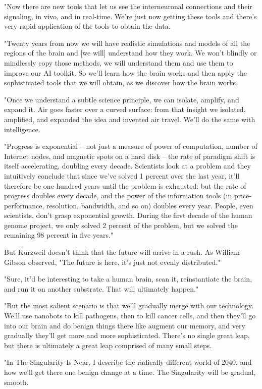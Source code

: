 "Now there are new tools that let us see the interneuronal
connections and their signaling, in vivo, and in real-time. We're
just now getting these tools and there's very rapid application of
the tools to obtain the data.

"Twenty years from now we will have realistic simulations and
models of all the regions of the brain and [we will] understand how
they work. We won't blindly or mindlessly copy those methods, we
will understand them and use them to improve our AI toolkit. So
we'll learn how the brain works and then apply the sophisticated
tools that we will obtain, as we discover how the brain works.

"Once we understand a subtle science principle, we can isolate,
amplify, and expand it. Air goes faster over a curved surface: from
that insight we isolated, amplified, and expanded the idea and
invented air travel. We'll do the same with intelligence.

"Progress is exponential -- not just a measure of power of
computation, number of Internet nodes, and magnetic spots on a hard
disk -- the rate of paradigm shift is itself accelerating, doubling
every decade. Scientists look at a problem and they intuitively
conclude that since we've solved 1 percent over the last year,
it'll therefore be one hundred years until the problem is
exhausted: but the rate of progress doubles every decade, and the
power of the information tools (in price-performance, resolution,
bandwidth, and so on) doubles every year. People, even scientists,
don't grasp exponential growth. During the first decade of the
human genome project, we only solved 2 percent of the problem, but
we solved the remaining 98 percent in five years."

But Kurzweil doesn't think that the future will arrive in a rush.
As William Gibson observed, "The future is here, it's just not
evenly distributed."

"Sure, it'd be interesting to take a human brain, scan it,
reinstantiate the brain, and run it on another substrate. That will
ultimately happen."

"But the most salient scenario is that we'll gradually merge with
our technology. We'll use nanobots to kill pathogens, then to kill
cancer cells, and then they'll go into our brain and do benign
things there like augment our memory, and very gradually they'll
get more and more sophisticated. There's no single great leap, but
there is ultimately a great leap comprised of many small steps.

"In The Singularity Is Near, I describe the radically different
world of 2040, and how we'll get there one benign change at a time.
The Singularity will be gradual, smooth.


